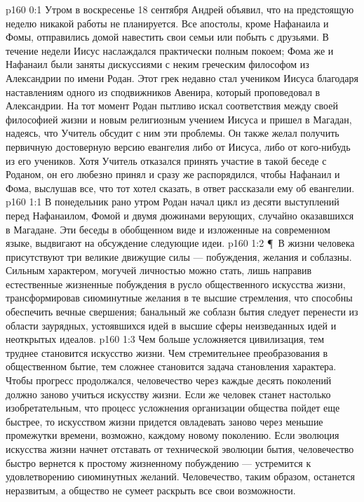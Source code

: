 \author{Комиссия срединников}
\vs p160 0:1 Утром в воскресенье 18 сентября Андрей объявил, что на предстоящую неделю никакой работы не планируется. Все апостолы, кроме Нафанаила и Фомы, отправились домой навестить свои семьи или побыть с друзьями. В течение недели Иисус наслаждался практически полным покоем; Фома же и Нафанаил были заняты дискуссиями с неким греческим философом из Александрии по имени Родан. Этот грек недавно стал учеником Иисуса благодаря наставлениям одного из сподвижников Авенира, который проповедовал в Александрии. На тот момент Родан пытливо искал соответствия между своей философией жизни и новым религиозным учением Иисуса и пришел в Магадан, надеясь, что Учитель обсудит с ним эти проблемы. Он также желал получить первичную достоверную версию евангелия либо от Иисуса, либо от кого\hyp{}нибудь из его учеников. Хотя Учитель отказался принять участие в такой беседе с Роданом, он его любезно принял и сразу же распорядился, чтобы Нафанаил и Фома, выслушав все, что тот хотел сказать, в ответ рассказали ему об евангелии.
\vs p160 1:1 В понедельник рано утром Родан начал цикл из десяти выступлений перед Нафанаилом, Фомой и двумя дюжинами верующих, случайно оказавшихся в Магадане. Эти беседы в обобщенном виде и изложенные на современном языке, выдвигают на обсуждение следующие идеи.
\vs p160 1:2 \P\ В жизни человека присутствуют три великие движущие силы --- побуждения, желания и соблазны. Сильным характером, могучей личностью можно стать, лишь направив естественные жизненные побуждения в русло общественного искусства жизни, трансформировав сиюминутные желания в те высшие стремления, что способны обеспечить вечные свершения; банальный же соблазн бытия следует перенести из области заурядных, устоявшихся идей в высшие сферы неизведанных идей и неоткрытых идеалов.
\vs p160 1:3 Чем больше усложняется цивилизация, тем труднее становится искусство жизни. Чем стремительнее преобразования в общественном бытие, тем сложнее становится задача становления характера. Чтобы прогресс продолжался, человечество через каждые десять поколений должно заново учиться искусству жизни. Если же человек станет настолько изобретательным, что процесс усложнения организации общества пойдет еще быстрее, то искусством жизни придется овладевать заново через меньшие промежутки времени, возможно, каждому новому поколению. Если эволюция искусства жизни начнет отставать от технической эволюции бытия, человечество быстро вернется к простому жизненному побуждению --- устремится к удовлетворению сиюминутных желаний. Человечество, таким образом, останется неразвитым, а общество не сумеет раскрыть все свои возможности.
